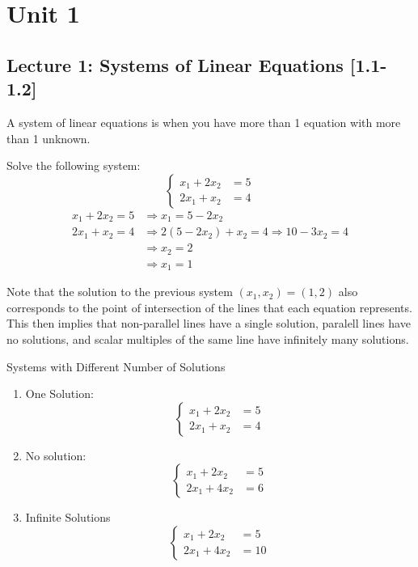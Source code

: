 \section{Unit 1}
\subsection{Lecture 1: Systems of Linear Equations [1.1-1.2]}

A system of linear equations is when you have more than 1 equation with more than 1 unknown.

\begin{example}{}{}
    Solve the following system:
    \[
        \begin{cases}
            x_1 + 2x_2 &= 5 \\
            2x_1 + x_2 &= 4
        \end{cases}
    \]
    \begin{align*}
        x_1 + 2x_2 = 5 &\Rightarrow x_1 = 5-2x_2 \\
        2x_1 + x_2 = 4 &\Rightarrow 2(5-2x_2) + x_2 = 4 \Rightarrow 10-3x_2=4 \\ 
        &\Rightarrow x_2=2 \\
        &\Rightarrow x_1 = 1
    \end{align*}
\end{example}

Note that the solution to the previous system $(x_1, x_2) = (1, 2)$ also corresponds to the point of intersection of the lines that each equation represents. This then implies that non-parallel lines have a single solution, paralell lines have no solutions, and scalar multiples of the same line have infinitely many solutions.

\begin{example}{Systems with Different Number of Solutions}{}
    \begin{enumerate}
        \item One Solution:
        \[
            \begin{cases}
                x_1 + 2x_2 &= 5 \\
                2x_1 + x_2 &= 4
            \end{cases} 
        \]

        \item No solution:
        \[
            \begin{cases}
                x_1 + 2x_2 &= 5 \\
                2x_1 + 4x_2 &= 6
            \end{cases}
        \]

        \item Infinite Solutions
        \[
            \begin{cases}
                x_1 + 2x_2 &= 5 \\
                2x_1 + 4x_2 &= 10
            \end{cases}
        \]
    \end{enumerate}
\end{example}

